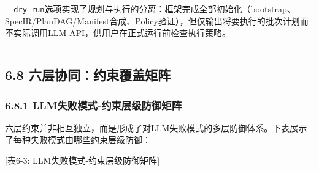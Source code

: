 \texttt{-\/-dry-run}选项实现了规划与执行的分离：框架完成全部初始化（bootstrap、SpecIR/PlanDAG/Manifest合成、Policy验证），但仅输出将要执行的批次计划而不实际调用LLM
API，供用户在正式运行前检查执行策略。

\begin{center}\rule{0.5\linewidth}{0.5pt}\end{center}

\subsection{6.8
六层协同：约束覆盖矩阵}\label{ux516dux5c42ux534fux540cux7ea6ux675fux8986ux76d6ux77e9ux9635}

\subsubsection{6.8.1
LLM失败模式-约束层级防御矩阵}\label{llmux5931ux8d25ux6a21ux5f0f-ux7ea6ux675fux5c42ux7ea7ux9632ux5fa1ux77e9ux9635}

六层约束并非相互独立，而是形成了对LLM失败模式的多层防御体系。下表展示了每种失败模式由哪些约束层级防御：

{[}表6-3: LLM失败模式-约束层级防御矩阵{]}

